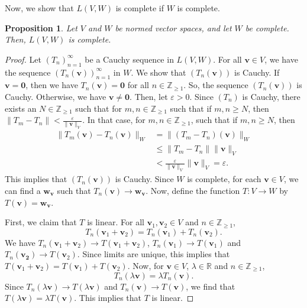 \documentclass[a4paper, openany]{memoir}
\theoremstyle{definition}
\theoremstyle{plain}
\newtheorem{proposition}[definition]{Proposition}
\begin{document}
    Now, we show that $L(V, W)$ is complete if $W$ is complete.
    \begin{proposition}
        Let $V$ and $W$ be normed vector spaces, and let $W$ be complete. Then, $L(V, W)$ is complete.
    \end{proposition}
    \begin{proof}
        Let $(T_n)_{n=1}^\infty$ be a Cauchy sequence in $L(V, W)$. For all $\bm{v} \in V$, we have the sequence $(T_n(\bm{v}))_{n=1}^\infty$ in $W$. We show that $(T_n(\bm{v}))$ is Cauchy. If $\bm{v} = \bm{0}$, then we have $T_n(\bm{v}) = \bm{0}$ for all $n \in \mathbb{Z}_{\geq 1}$. So, the sequence $(T_n(\bm{v}))$ is Cauchy. Otherwise, we have $\bm{v} \neq \bm{0}$. Then, let $\varepsilon > 0$. Since $(T_n)$ is Cauchy, there exists an $N \in \mathbb{Z}_{\geq 1}$ such that for $m, n \in \mathbb{Z}_{\geq 1}$ such that if $m, n \geq N$, then $\lVert T_m - T_n \rVert < \frac{\varepsilon}{\lVert \bm{v} \rVert_V}$. In that case, for $m, n \in \mathbb{Z}_{\geq 1}$, such that if $m, n \geq N$, then
        \begin{align*}
            \lVert T_m(\bm{v}) - T_n(\bm{v}) \rVert_W &= \lVert (T_m - T_n)(\bm{v}) \rVert_W \\
            &\leq \lVert T_m - T_n \rVert \lVert \bm{v} \rVert_V  \\
            &< \frac{\varepsilon}{\lVert \bm{v} \rVert_V} \lVert \bm{v} \rVert_V = \varepsilon.
        \end{align*}
        This implies that $(T_n(\bm{v}))$ is Cauchy. Since $W$ is complete, for each $\bm{v} \in V$, we can find a $\bm{w}_{\bm{v}}$ such that $T_n(\bm{v}) \to \bm{w}_{\bm{v}}$. Now, define the function $T: V \to W$ by $T(\bm{v}) = \bm{w}_{\bm{v}}$.

        First, we claim that $T$ is linear. For all $\bm{v}_1, \bm{v}_2 \in V$ and $n \in \mathbb{Z}_{\geq 1}$,
        \[T_n(\bm{v}_1 + \bm{v}_2) = T_n(\bm{v}_1) + T_n(\bm{v}_2).\]
        We have $T_n(\bm{v}_1 + \bm{v}_2) \to T(\bm{v}_1 + \bm{v}_2)$, $T_n(\bm{v}_1) \to T(\bm{v}_1)$ and $T_n(\bm{v_2}) \to T(\bm{v}_2)$. Since limits are unique, this implies that $T(\bm{v}_1 + \bm{v}_2) = T(\bm{v}_1) + T(\bm{v}_2)$. Now, for $\bm{v} \in V$, $\lambda \in \mathbb{R}$ and $n \in \mathbb{Z}_{\geq 1}$,
        \[T_n(\lambda \bm{v}) = \lambda T_n(\bm{v}).\]
        Since $T_n(\lambda \bm{v}) \to T(\lambda \bm{v})$ and $T_n(\bm{v}) \to T(\bm{v})$, we find that $T(\lambda \bm{v}) = \lambda T(\bm{v})$. This implies that $T$ is linear.


\end{proof}
\end{document}
